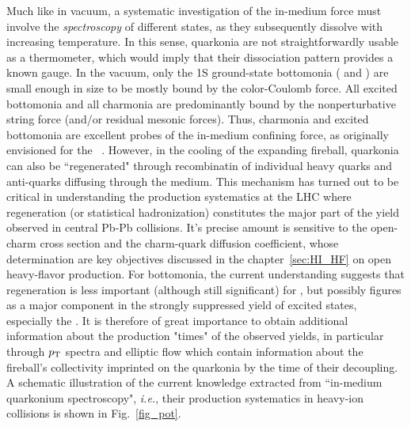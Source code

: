 \documentclass[../report.tex]{subfiles}
\providecommand{\pt}{\ensuremath{p_\text{T}}\Xspace}
\begin{document}
Much like in vacuum, a systematic investigation of the in-medium force must involve the 
{\em spectroscopy} of different states, as they subsequently dissolve with increasing 
temperature. In this sense, quarkonia are not straightforwardly usable as a thermometer, 
which would imply that their dissociation pattern provides a known gauge. In the vacuum, 
only the 1S ground-state bottomonia ( and \PGhb) are small enough in size 
to be mostly bound by the color-Coulomb force. All excited bottomonia and all charmonia are 
predominantly bound by the nonperturbative string force (and/or residual mesonic forces). 
Thus, charmonia and excited bottomonia are excellent probes of the in-medium confining
force, as originally envisioned for the \PJgy~\cite{Matsui:1986dk}.
However, in the cooling of the expanding fireball, quarkonia can also be ``regenerated" 
through recombinatin of individual heavy quarks and anti-quarks diffusing through the medium. 
This mechanism has turned out to be critical in understanding the
\PJgy production systematics at the LHC where regeneration (or statistical hadronization) 
constitutes the major part of the yield observed in central Pb-Pb collisions. It's precise
amount is sensitive to the open-charm cross section and the charm-quark diffusion
coefficient, whose determination are key objectives discussed in the chapter~\ref{sec:HI_HF} on open 
heavy-flavor production. For bottomonia, the current understanding suggests that regeneration 
is less 
important (although still significant) for , but possibly figures as a
major component in the strongly suppressed yield of excited states, especially the 
. It is therefore of great importance to obtain additional information about
the production "times" of the observed yields, in particular through $\pt$ spectra
and elliptic flow which contain information about the fireball's collectivity imprinted
on the quarkonia by the time of their decoupling. A schematic illustration of the current knowledge
extracted from ``in-medium quarkonium spectroscopy", {\it i.e.}, their production systematics 
in heavy-ion collisions is shown in Fig.~\ref{fig_pot}.        
\end{document}
